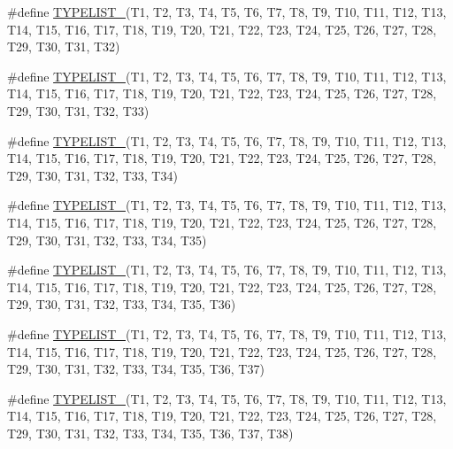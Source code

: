 \begin{DoxyCompactItemize}
\item 
\#define \mbox{\hyperlink{adat-devel_2lib_2adat_2typelist_8h_a272418d742bbaafb77a25fea5234a65b}{T\+Y\+P\+E\+L\+I\+S\+T\+\_}}(T1,  T2,  T3,  T4,  T5,  T6,  T7,  T8,  T9,  T10,  T11,  T12,  T13,  T14,  T15,  T16,  T17,  T18,  T19,  T20,  T21,  T22,  T23,  T24,  T25,  T26,  T27,  T28,  T29,  T30,  T31,  T32)
\item 
\#define \mbox{\hyperlink{adat-devel_2lib_2adat_2typelist_8h_a392b93514d6e08f6416876023b327868}{T\+Y\+P\+E\+L\+I\+S\+T\+\_}}(T1,  T2,  T3,  T4,  T5,  T6,  T7,  T8,  T9,  T10,  T11,  T12,  T13,  T14,  T15,  T16,  T17,  T18,  T19,  T20,  T21,  T22,  T23,  T24,  T25,  T26,  T27,  T28,  T29,  T30,  T31,  T32,  T33)
\item 
\#define \mbox{\hyperlink{adat-devel_2lib_2adat_2typelist_8h_a19e0bb94e5e00d26009334b176e139a4}{T\+Y\+P\+E\+L\+I\+S\+T\+\_}}(T1,  T2,  T3,  T4,  T5,  T6,  T7,  T8,  T9,  T10,  T11,  T12,  T13,  T14,  T15,  T16,  T17,  T18,  T19,  T20,  T21,  T22,  T23,  T24,  T25,  T26,  T27,  T28,  T29,  T30,  T31,  T32,  T33,  T34)
\item 
\#define \mbox{\hyperlink{adat-devel_2lib_2adat_2typelist_8h_aeca792e816ec8f65ad06218cc63144bc}{T\+Y\+P\+E\+L\+I\+S\+T\+\_}}(T1,  T2,  T3,  T4,  T5,  T6,  T7,  T8,  T9,  T10,  T11,  T12,  T13,  T14,  T15,  T16,  T17,  T18,  T19,  T20,  T21,  T22,  T23,  T24,  T25,  T26,  T27,  T28,  T29,  T30,  T31,  T32,  T33,  T34,  T35)
\item 
\#define \mbox{\hyperlink{adat-devel_2lib_2adat_2typelist_8h_aceaf61b62cb620bcf6dd31ec2fde4bf4}{T\+Y\+P\+E\+L\+I\+S\+T\+\_}}(T1,  T2,  T3,  T4,  T5,  T6,  T7,  T8,  T9,  T10,  T11,  T12,  T13,  T14,  T15,  T16,  T17,  T18,  T19,  T20,  T21,  T22,  T23,  T24,  T25,  T26,  T27,  T28,  T29,  T30,  T31,  T32,  T33,  T34,  T35,  T36)
\item 
\#define \mbox{\hyperlink{adat-devel_2lib_2adat_2typelist_8h_a535bc24e713aa8d075b8479ba3ed64c0}{T\+Y\+P\+E\+L\+I\+S\+T\+\_}}(T1,  T2,  T3,  T4,  T5,  T6,  T7,  T8,  T9,  T10,  T11,  T12,  T13,  T14,  T15,  T16,  T17,  T18,  T19,  T20,  T21,  T22,  T23,  T24,  T25,  T26,  T27,  T28,  T29,  T30,  T31,  T32,  T33,  T34,  T35,  T36,  T37)
\item 
\#define \mbox{\hyperlink{adat-devel_2lib_2adat_2typelist_8h_a228d43d7c934c619d232ba7b8b1648b7}{T\+Y\+P\+E\+L\+I\+S\+T\+\_}}(T1,  T2,  T3,  T4,  T5,  T6,  T7,  T8,  T9,  T10,  T11,  T12,  T13,  T14,  T15,  T16,  T17,  T18,  T19,  T20,  T21,  T22,  T23,  T24,  T25,  T26,  T27,  T28,  T29,  T30,  T31,  T32,  T33,  T34,  T35,  T36,  T37,  T38)

\end{DoxyCompactItemize}
